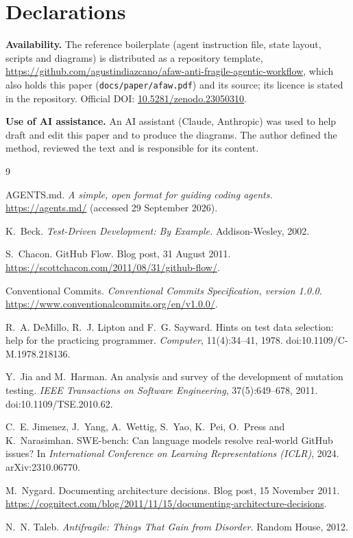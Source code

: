 \documentclass[11pt,a4paper]{article}
\begin{document}
\section*{Declarations}

\textbf{Availability.} The reference boilerplate (agent instruction file, state layout, scripts and diagrams) is distributed as a repository template, \url{https://github.com/agustindiazcano/afaw-anti-fragile-agentic-workflow}, which also holds this paper (\texttt{docs/paper/afaw.pdf}) and its source; its licence is stated in the repository. Official DOI: \href{https://doi.org/10.5281/zenodo.23050310}{10.5281/zenodo.23050310}.

\textbf{Use of AI assistance.} An AI assistant (Claude, Anthropic) was used to help draft and edit this paper and to produce the diagrams. The author defined the method, reviewed the text and is responsible for its content.

\begin{thebibliography}{9}
\small

AGENTS.md. \emph{A simple, open format for guiding coding agents.} \url{https://agents.md/} (accessed 29 September 2026).

K.~Beck. \emph{Test-Driven Development: By Example.} Addison-Wesley, 2002.

S.~Chacon. GitHub Flow. Blog post, 31 August 2011. \url{https://scottchacon.com/2011/08/31/github-flow/}.

Conventional Commits. \emph{Conventional Commits Specification, version 1.0.0.} \url{https://www.conventionalcommits.org/en/v1.0.0/}.

R.~A. DeMillo, R.~J. Lipton and F.~G. Sayward. Hints on test data selection: help for the practicing programmer. \emph{Computer}, 11(4):34--41, 1978. doi:10.1109/C-M.1978.218136.

Y.~Jia and M.~Harman. An analysis and survey of the development of mutation testing. \emph{IEEE Transactions on Software Engineering}, 37(5):649--678, 2011. doi:10.1109/TSE.2010.62.

C.~E. Jimenez, J.~Yang, A.~Wettig, S.~Yao, K.~Pei, O.~Press and K.~Narasimhan. SWE-bench: Can language models resolve real-world GitHub issues? In \emph{International Conference on Learning Representations (ICLR)}, 2024. arXiv:2310.06770.

M.~Nygard. Documenting architecture decisions. Blog post, 15 November 2011. \url{https://cognitect.com/blog/2011/11/15/documenting-architecture-decisions}.

N.~N. Taleb. \emph{Antifragile: Things That Gain from Disorder.} Random House, 2012.

\end{thebibliography}
\end{document}
